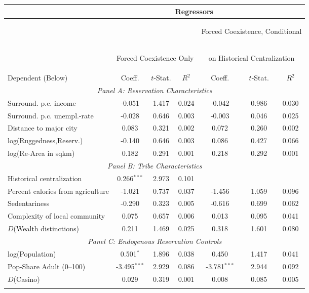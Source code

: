 \begin{center}
\begin{tabular}{lcccccc}
\hline \noalign{\smallskip} & \multicolumn{5}{c}{Regressors} & \\ \hline\hline
 & \multicolumn{3}{c}{} & \multicolumn{3}{c}{\begin{footnotesize}Forced Coexistence, Conditional\end{footnotesize}}\\  & \multicolumn{3}{c}{\begin{footnotesize}Forced Coexistence Only\end{footnotesize}} & \multicolumn{3}{c}{\begin{footnotesize}on Historical Centralization\end{footnotesize}}\\ \hline
Dependent (Below) & Coeff. & $ t$-Stat. & $ R^2$ & Coeff. & $ t$-Stat. & $ R^2$\\ \hline
\multicolumn{7}{c}{\textit{Panel A: Reservation Characteristics}} \\ 
\noalign{\smallskip}\noalign{\smallskip}Surround. p.c. income & -0.051 & 1.417 & 0.024 & -0.042 & 0.986 & 0.030\\
Surround. p.c. unempl.-rate & -0.028 & 0.646 & 0.003 & -0.003 & 0.046 & 0.025\\
Distance to major city & 0.083 & 0.321 & 0.002 & 0.072 & 0.260 & 0.002\\
log(Ruggedness,Reserv.) & -0.140 & 0.646 & 0.003 & 0.086 & 0.427 & 0.066\\
log(Re-Area in sqkm) & 0.182 & 0.291 & 0.001 & 0.218 & 0.292 & 0.001\\
\multicolumn{7}{c}{\textit{Panel B: Tribe Characteristics}} \\ 
Historical centralization & 0.266$^{***}$ & 2.973 & 0.101 &  &  & \\
Percent calories from agriculture & -1.021 & 0.737 & 0.037 & -1.456 & 1.059 & 0.096\\
Sedentariness & -0.290 & 0.323 & 0.005 & -0.616 & 0.699 & 0.062\\
Complexity of local community & 0.075 & 0.657 & 0.006 & 0.013 & 0.095 & 0.041\\
$ D$(Wealth distinctions) & 0.211 & 1.469 & 0.025 & 0.318 & 1.601 & 0.080\\
\multicolumn{7}{c}{\textit{Panel C: Endogenous Reservation Controls}} \\ 
log(Population) & 0.501$^*$ & 1.896 & 0.038 & 0.450 & 1.417 & 0.041\\
Pop-Share Adult (0–100) & -3.495$^{***}$ & 2.929 & 0.086 & -3.781$^{***}$ & 2.944 & 0.092\\
$ D$(Casino) & 0.029 & 0.319 & 0.001 & 0.008 & 0.085 & 0.005\\
\noalign{\smallskip}\hline\end{tabular}\\
\end{center}
